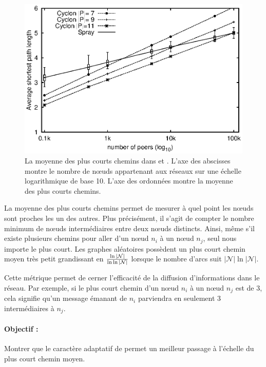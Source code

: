 \begin{figure}
  \centering
  \includegraphics[width=.8\textwidth]{img/spray/avgpath.eps}
  \caption[Plus courts chemins moyens]{\label{net:fig:shortestpath} La moyenne
    des plus courts chemins dans \SPRAY et \CYCLON. L'axe des abscisses montre
    le nombre de nœuds appartenant aux réseaux sur une échelle logarithmique de
    base 10. L'axe des ordonnées montre la moyenne des plus courts chemins.}
\end{figure}

La moyenne des plus courts chemins permet de mesurer à quel point les nœuds sont
proches les un des autres. Plus précisément, il s'agit de compter le nombre
minimum de nœuds intermédiaires entre deux nœuds distincts. Ainsi, même s'il
existe plusieurs chemins pour aller d'un nœud $n_i$ à un nœud $n_j$, seul nous
importe le plus court.  Les graphes aléatoires possèdent un plus court chemin
moyen très petit grandissant en $\ln|\mathcal{N}|\over\ln\ln|\mathcal{N}|$
lorsque le nombre d'arcs suit $|\mathcal{N}|\ln|\mathcal{N}|$.

Cette métrique permet de cerner l'efficacité de la diffusion d'informations dans
le réseau. Par exemple, si le plus court chemin d'un nœud $n_i$ à un nœud $n_j$
est de 3, cela signifie qu'un message émanant de $n_i$ parviendra en seulement 3
intermédiaires à $n_j$.

\paragraph{Objectif :} Montrer que le caractère adaptatif de \SPRAY permet un
meilleur passage à l'échelle du plus court chemin moyen.

